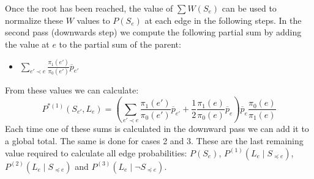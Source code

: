 \documentclass[../../main.tex]{subfiles}
\begin{document}
Once the root has been reached, the value of $\sum W(S_e)$ can be used to normalize these $W$ values to $P(S_e)$ at each edge in the following steps.
In the second pass (downwards step) we compute the following partial sum by adding the value at $e$ to the partial sum of the parent:
\begin{itemize}
    \item $\sum_{e'\prec e}\frac{\pi_1(e')}{\pi_0(e')}\overline{p}_{e'}$
\end{itemize}

From these values we can calculate:
\begin{equation*}
    P^{*(1)}(S_{e'},L_e) = \left(\sum_{e'\prec e}\frac{\pi_1(e')}{\pi_0(e')}\overline{p}_{e'} + \frac{1}{2}\frac{\pi_1(e)}{\pi_0(e)}\overline{p}_e\right)\overline{p}_e\frac{\pi_0(e)}{\pi_1(e)}
\end{equation*}
Each time one of these sums is calculated in the downward pass we can add it to a global total.
The same is done for  cases 2 and 3.
These are the last remaining value required to calculate all edge probabilities: $P(S_e)$, $P^{(1)}(L_e\mid S_{\preceq e})$, $P^{(2)}(L_e\mid S_{\preceq e})$ and $P^{(3)}(L_e\mid \neg S_{\preceq e})$.
\end{document}
